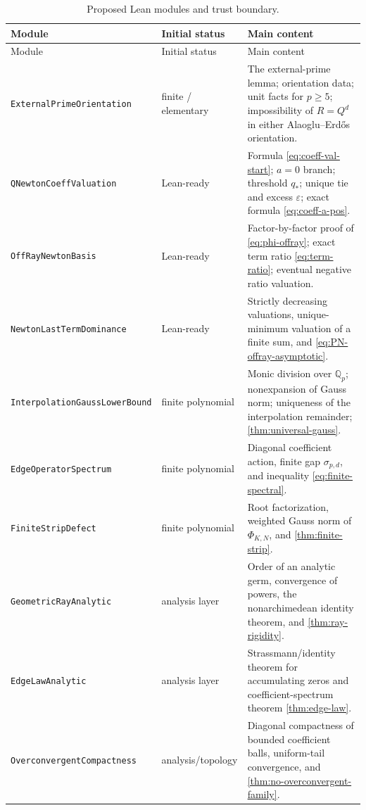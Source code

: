 \documentclass[11pt,oneside]{article}
\theoremstyle{definition}
\newcommand{\Qp}{\mathbb Q_p}
\newcommand{\AEconj}{Alaoglu--Erd\H{o}s}
\begin{document}
\begingroup\small
\begin{longtable}{@{}p{}p{}p{}@{}}
\caption{Proposed Lean modules and trust boundary.}\label{tab:lean-modules}\\
\toprule
Module & Initial status & Main content\\
\midrule
\endfirsthead
\toprule
Module & Initial status & Main content\\
\midrule
\endhead
\texttt{ExternalPrimeOrientation} & finite / elementary & The external-prime lemma; orientation data; unit facts for $p\ge5$; impossibility of $R=Q^d$ in either \AEconj{} orientation.\\
\texttt{QNewtonCoeffValuation} & Lean-ready & Formula \eqref{eq:coeff-val-start}; $a=0$ branch; threshold $q_*$; unique tie and excess $\varepsilon$; exact formula \eqref{eq:coeff-a-pos}.\\
\texttt{OffRayNewtonBasis} & Lean-ready & Factor-by-factor proof of \eqref{eq:phi-offray}; exact term ratio \eqref{eq:term-ratio}; eventual negative ratio valuation.\\
\texttt{NewtonLastTermDominance} & Lean-ready & Strictly decreasing valuations, unique-minimum valuation of a finite sum, and \eqref{eq:PN-offray-asymptotic}.\\
\texttt{InterpolationGaussLowerBound} & finite polynomial & Monic division over $\Qp$; nonexpansion of Gauss norm; uniqueness of the interpolation remainder; \cref{thm:universal-gauss}.\\
\texttt{EdgeOperatorSpectrum} & finite polynomial & Diagonal coefficient action, finite gap $\sigma_{p,d}$, and inequality \eqref{eq:finite-spectral}.\\
\texttt{FiniteStripDefect} & finite polynomial & Root factorization, weighted Gauss norm of $\Phi_{K,N}$, and \cref{thm:finite-strip}.\\
\texttt{GeometricRayAnalytic} & analysis layer & Order of an analytic germ, convergence of powers, the nonarchimedean identity theorem, and \cref{thm:ray-rigidity}.\\
\texttt{EdgeLawAnalytic} & analysis layer & Strassmann/identity theorem for accumulating zeros and coefficient-spectrum theorem \cref{thm:edge-law}.\\
\texttt{OverconvergentCompactness} & analysis/topology & Diagonal compactness of bounded coefficient balls, uniform-tail convergence, and \cref{thm:no-overconvergent-family}.\\
\bottomrule
\end{longtable}
\endgroup
\end{document}

